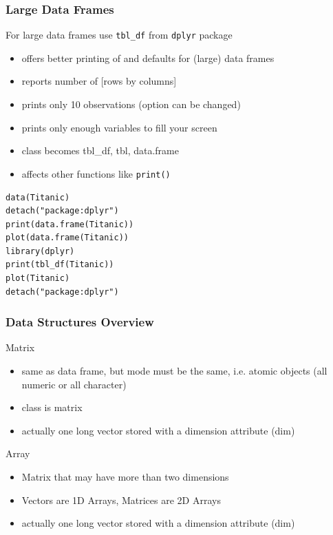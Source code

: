 \documentclass[xcolor={svgnames},10pt,
handout
]{beamer}
\begin{document}
\begin{frame}[fragile]
\frametitle{Large Data Frames}
For large data frames use \texttt{tbl\_df} from \texttt{dplyr} package
\begin{itemize}
	\item offers better printing of and defaults for (large) data frames
	\item reports number of [rows by columns]
	\item prints only 10 observations (option can be changed)
	\item prints only enough variables to fill your screen
	\item class becomes tbl\_df, tbl, data.frame
	\item affects other functions like \lstinline|print()|
\end{itemize}
\begin{lstlisting}
data(Titanic)
detach("package:dplyr")
print(data.frame(Titanic))
plot(data.frame(Titanic))
library(dplyr)
print(tbl_df(Titanic))
plot(Titanic)
detach("package:dplyr")
\end{lstlisting}
\end{frame}


\begin{frame}\frametitle{Data Structures Overview}
Matrix
\begin{itemize}
\item same as data frame, but mode must be the same, i.e. atomic objects (all numeric or all character)
\item class is matrix
\item actually one long vector stored with a dimension attribute (dim)
\end{itemize}
Array
\begin{itemize}
\item Matrix that may have more than two dimensions
\item Vectors are 1D Arrays, Matrices are 2D Arrays
\item actually one long vector stored with a dimension attribute (dim)
\end{itemize}
\end{frame}
\end{document}
